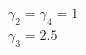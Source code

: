 \documentclass[preview]{standalone}
\begin{document}
\begin{center}
$\gamma_2 = \gamma_4 = 1$\\$\gamma_3 = 2.5$
\end{center}
\end{document}
